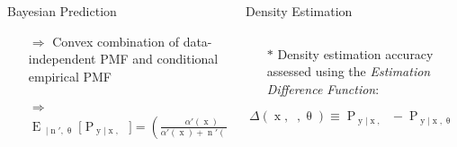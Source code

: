 \documentclass[final]{beamer}
\DeclareMathOperator{\xrm}{\mathrm{x}}
\DeclareMathOperator{\yrm}{\mathrm{y}}
\DeclareMathOperator{\nrm}{\mathrm{n}}
\DeclareMathOperator{\nbarrm}{\bar{\mathrm{n}}}
\DeclareMathOperator{\Prm}{\mathrm{P}}
\DeclareMathOperator{\Erm}{\mathrm{E}}
\begin{document}
\begin{frame}{}
\begin{columns}[T]
\begin{column}{.34\linewidth}
\begin{block}{Bayesian Prediction}
\vspace{1cm}

\begin{itemize}
\item[$\Rightarrow$] Convex combination of data-independent PMF and conditional empirical PMF
\item[$\Rightarrow$] $\Erm_{\nbarrm | \nrm',\uptheta}\big[ \Prm_{\yrm | \xrm,\nbarrm} \big] = \left(\frac{\alpha'(\xrm)}{\alpha'(\xrm) + \nrm'(\xrm)}\right) \frac{\alpha(\cdot,\xrm)}{\alpha'(\xrm)} + \left(\frac{\nrm'(\xrm)}{\alpha'(\xrm) + \nrm'(\xrm)}\right) \tilde{\uptheta}(\xrm)$
\end{itemize}



\end{block}  
    
\end{column}





\begin{column}{.34\linewidth}
      
\begin{block}{Density Estimation}

\begin{columns}[c]
\begin{column}{.53\linewidth}

\begin{itemize}
\item[$*$] Density estimation accuracy assessed using the \emph{Estimation Difference Function}:
\end{itemize}

\begin{equation*}
\Delta(\xrm,\nbarrm,\uptheta) \equiv \Prm_{\yrm | \xrm,\nbarrm} - \Prm_{\yrm | \xrm,\uptheta}
\end{equation*}

\vspace{1cm}


\end{column}
\end{columns}
\end{block}
\end{column}
\end{columns}
\end{frame}
\end{document}
